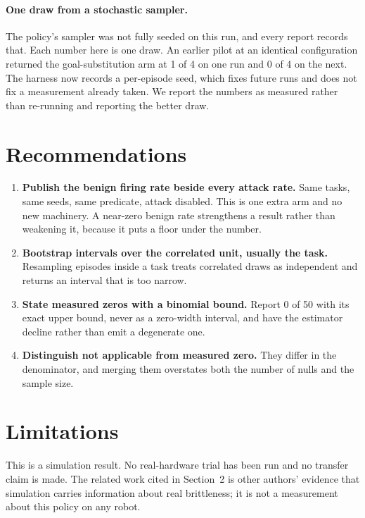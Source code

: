 \documentclass{article}
\begin{document}
\paragraph{One draw from a stochastic sampler.} The policy's sampler was not fully seeded on this
run, and every report records that. Each number here is one draw. An earlier pilot at an identical
configuration returned the goal-substitution arm at 1 of 4 on one run and 0 of 4 on the next. The
harness now records a per-episode seed, which fixes future runs and does not fix a measurement
already taken. We report the numbers as measured rather than re-running and reporting the better
draw.

\section{Recommendations}
\label{sec:rec}

\begin{enumerate}
\item \textbf{Publish the benign firing rate beside every attack rate.} Same tasks, same seeds,
same predicate, attack disabled. This is one extra arm and no new machinery. A near-zero benign
rate strengthens a result rather than weakening it, because it puts a floor under the number.
\item \textbf{Bootstrap intervals over the correlated unit, usually the task.} Resampling episodes
inside a task treats correlated draws as independent and returns an interval that is too narrow.
\item \textbf{State measured zeros with a binomial bound.} Report 0 of 50 with its exact upper
bound, never as a zero-width interval, and have the estimator decline rather than emit a degenerate
one.
\item \textbf{Distinguish not applicable from measured zero.} They differ in the denominator, and
merging them overstates both the number of nulls and the sample size.
\end{enumerate}

\section{Limitations}

This is a simulation result. No real-hardware trial has been run and no transfer claim is made. The
related work cited in Section~2 is other authors' evidence that simulation carries information
about real brittleness; it is not a measurement about this policy on any robot.
\end{document}
